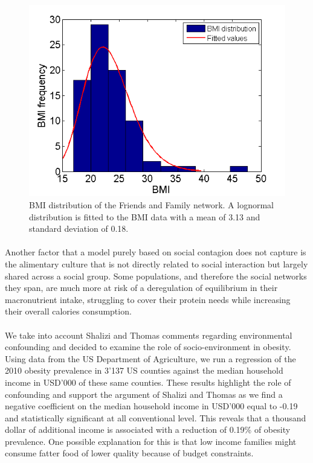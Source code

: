 \documentclass[11pt]{article}
\begin{document}
\begin{figure}[!ht]
\center
   \includegraphics[scale = 0.9]{bmi_distribution_figure4.png}
   \caption{\label{4} BMI distribution of the Friends and Family network. A lognormal distribution is fitted to the BMI data with a mean of 3.13 and standard deviation of 0.18.}
\end{figure}

\paragraph{}

Another factor that a model purely based on social contagion does not capture is the alimentary culture that is not directly related to social interaction but largely shared across a social group. Some populations, and therefore the social networks they span, are much more at risk of a deregulation of equilibrium in their macronutrient intake, struggling to cover their protein needs while increasing their overall calories consumption. 

\paragraph{}
We take into account Shalizi and Thomas comments regarding environmental confounding and decided to examine the role of socio-environment in obesity. Using data from the US Department of Agriculture, we run a regression of the 2010 obesity prevalence in 3'137 US counties against the median household income in USD'000 of these same counties. These results highlight the role of confounding and support the argument of Shalizi and Thomas as we find a negative coefficient on the median household income in USD'000 equal to -0.19 and statistically significant at all conventional level. This reveals that a thousand dollar of additional income is associated with a reduction of 0.19\% of obesity prevalence. One possible explanation for this is that low income families might consume fatter food of lower quality because of budget constraints.
\end{document}
